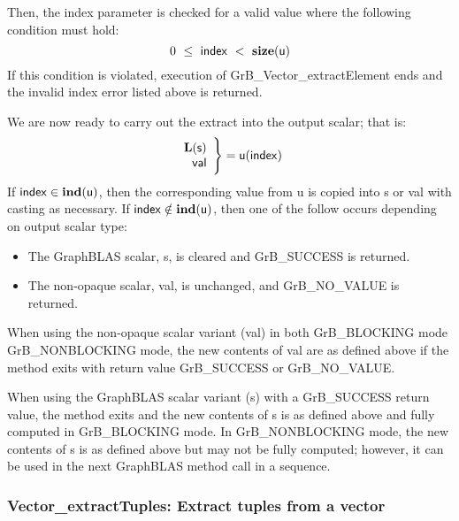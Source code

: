 Then, the {\sf index} parameter is checked for a valid value where the following
condition must hold:
\[
	0\ \leq\ {\sf index}\ <\ \mathbf{size}({\sf u})
\]
If this condition is violated, execution of {\sf GrB\_Vector\_extractElement} 
ends and the invalid index error listed above is returned.

We are now ready to carry out the extract into the output scalar; that is: 
\begin{align*}
  \begin{array}{r}
    \mathbf{L}({\sf s}) \\
    {\sf val} 
  \end{array}
  \Bigg\}  =  {\sf u}({\sf index}) 
\end{align*}
If ${\sf index} \in \mathbf{ind}({\sf u})$, then the corresponding value from 
{\sf u} is copied into {\sf s} or {\sf val} with casting as necessary. If ${\sf index} \notin \mathbf{ind}({\sf u})$, then one of the follow occurs depending on output scalar type: 
\begin{itemize}
\item The GraphBLAS scalar, {\sf s}, is cleared and {\sf GrB\_SUCCESS} is returned.
\item The non-opaque scalar, {\sf val}, is unchanged, and {\sf GrB\_NO\_VALUE} is returned. 
\end{itemize}

When using the non-opaque scalar variant ({\sf val}) in both {\sf GrB\_BLOCKING} mode 
{\sf GrB\_NONBLOCKING} mode, the new contents of {\sf val} are as defined above
if the method exits with return value {\sf GrB\_SUCCESS} or {\sf GrB\_NO\_VALUE}. 

When using the GraphBLAS scalar variant ({\sf s}) with a {\sf GrB\_SUCCESS} return value,
the method exits and the new contents of {\sf s} is as defined above
and fully computed in {\sf GrB\_BLOCKING} mode. In {\sf GrB\_NONBLOCKING} mode, the 
new contents of {\sf s} is as defined above but may not be fully computed; however, 
it can be used in the next GraphBLAS method call in a sequence.


\subsubsection{{\sf Vector\_extractTuples}: Extract tuples from a vector}
\label{Sec:Vector_extractTuples}

